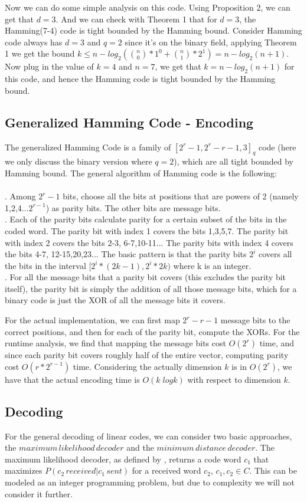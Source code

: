 \documentclass{article}
\begin{document}
Now we can do some simple analysis on this code. Using Proposition 2, we can get that $d = 3$. And we can check with Theorem 1 that for $d=3$, the Hamming(7-4) code is tight bounded by the Hamming bound. Consider Hamming code always has $d=3$ and $q=2$ since it's on the binary field, applying Theorem 1 we get the bound $k \le n-log_2({n\choose 0}*1^0 + {n\choose 1}*2^1) = n-log_2(n+1)$. Now plug in the value of $k=4$ and $n = 7$, we get that $k = n-log_2(n+1)$ for this code, and hence the Hamming code is tight bounded by the Hamming bound.

\subsection{Generalized Hamming Code - Encoding}
The generalized Hamming Code is a family of $[2^r-1, 2^r-r-1,3]_q$ code (here we only discuss the binary version where $q=2$), which are all tight bounded by Hamming bound. The general algorithm of Hamming code is the following:\\\\
. \quad Among $2^r-1$ bits, choose all the bits at positions that are powers of 2 (namely 1,2,4...$2^{r-1}$) as parity bits. The other bits are message bits.\\
. \quad Each of the parity bits calculate parity for a certain subset of the bits in the coded word. The parity bit with index 1 covers the bits 1,3,5,7. The parity bit with index 2 covers the bits 2-3, 6-7,10-11... The parity bits with index 4 covers the bits 4-7, 12-15,20,23... The basic pattern is that the parity bits $2^i$ covers all the bits in the interval $[2^i*(2k-1), 2^i*2k )$ where k is an integer.\\
. \quad For all the message bits that a parity bit covers (this excludes the parity bit itself), the parity bit is simply the addition of all those message bits, which for a binary code is just the XOR of all the message bits it covers. 

For the actual implementation, we can first map $2^r-r-1$ message bits to the correct positions, and then for each of the parity bit, compute the XORs. For the runtime analysis, we find that mapping the message bits cost $O(2^r)$ time, and since each parity bit covers roughly half of the entire vector, computing parity cost $O(r*2^{r-1})$ time. Considering the actually dimension $k$ is in $O(2^r)$, we have that the actual encoding time is $O(k \;logk)$ with respect to dimension $k$.
\subsection{Decoding}
For the general decoding of linear codes, we can consider two basic approaches, the $maximum\, likelihood\, decoder$ and the $minimum\, distance\, decoder$. The maximum likelihood decoder, as defined by \cite{decoder_citation}, returns a code word $c_1$ that maximizes $P( c_2\, received | c_1\, sent)$ for a received word $c_2$, $c_1, c_2 \in C$. This can be modeled as an integer programming problem, but due to complexity we will not consider it further. 
\end{document}
